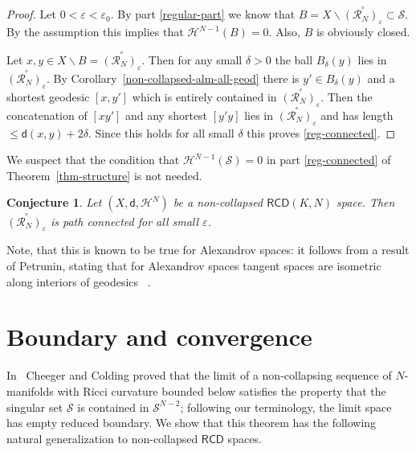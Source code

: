 \documentclass[a4paper]{amsart}
\newcounter{assu}
\theoremstyle{plain}
\newtheorem{conjecture}[lemma]{Conjecture}
\theoremstyle{definition}
\numberwithin{equation}{section}
\renewcommand{\S}{\mathcal{S}}
\newcommand{\RCD}{\mathsf{RCD}}
\newcommand{\sfd}{\mathsf d}
\newcommand{\cH}{\mathcal{H}}
\newcommand{\eps}{\varepsilon}
\begin{document}
{\begin{proof}
Let $0<\eps<\eps_0$.
By part \eqref{regular-part}  we know that $B=X\backslash \overset{\circ}{({\mathcal R}_{N})_{\eps}}\subset \S$. By the assumption this implies that $\mathcal H^{N-1}(B)=0$. Also, $B$ is obviously closed. 

Let $x,y\in X\backslash B= \overset{\circ}{({\mathcal R}_{N})_{\eps}}$. Then for any small $\delta>0$ the ball $B_\delta(y)$ lies in $\overset{\circ}{({\mathcal R}_{N})_{\eps}}$. By Corollary~\ref{non-collapsed-alm-all-geod} 
 there is $y'\in B_\delta(y)$ and a shortest geodesic $[x,y']$ which is entirely contained in  $\overset{\circ}{({\mathcal R}_{N})_{\eps}}$. Then the concatenation of $[xy']$ and any shortest $[y'y]$ lies in  $\overset{\circ}{({\mathcal R}_{N})_{\eps}}$ and has length $\le \sfd(x,y)+2\delta$. Since this holds for all small $\delta$ this proves  \eqref{reg-connected}.


\end{proof}

We suspect that the condition that $\mathcal H^{N-1}(\S)=0$ in part \eqref{reg-connected}  of Theorem~\ref{thm-structure} is not needed.
\begin{conjecture}
 Let $(X,\sfd,\cH^{N})$ be a non-collapsed $\RCD(K,N)$ space. Then  $\overset{\circ}{({\mathcal R}_{N})_{\eps}}$ is path connected for all small $\eps$.
 
 \end{conjecture}
Note, that this is known to be true for Alexandrov spaces: it follows from a result of Petrunin, stating that for Alexandrov spaces tangent  spaces are isometric along interiors of geodesics ~\cite{petruninsecondvariation}.


\section{Boundary and convergence}\label{Sec:BoundConv}



In~\cite[Theorem 6.1]{CC97} Cheeger and Colding proved that the limit of a non-collapsing sequence of $N$-manifolds with Ricci curvature bounded below satisfies the property that the singular set
$\S$ is contained in $\S^{N-2}$; following our terminology, the limit space  has  empty reduced boundary. We show that this theorem has the following natural generalization to non-collapsed $\RCD$ spaces.



}
\end{document}
